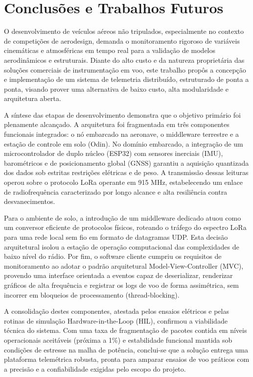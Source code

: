 \chapter{Conclusões e Trabalhos Futuros}
\label{chap:conclusoes-e-trabalhos-futuros}

O desenvolvimento de veículos aéreos não tripulados, especialmente no contexto de competições de aerodesign, demanda o monitoramento rigoroso de variáveis cinemáticas e atmosféricas em tempo real para a validação de modelos aerodinâmicos e estruturais. Diante do alto custo e da natureza proprietária das soluções comerciais de instrumentação em voo, este trabalho propôs a concepção e implementação de um sistema de telemetria distribuído, estruturado de ponta a ponta, visando prover uma alternativa de baixo custo, alta modularidade e arquitetura aberta.

A síntese das etapas de desenvolvimento demonstra que o objetivo primário foi plenamente alcançado. A arquitetura foi fragmentada em três componentes funcionais integrados: o nó embarcado na aeronave, o middleware terrestre e a estação de controle em solo (Odin). No domínio embarcado, a integração de um microcontrolador de duplo núcleo (ESP32) com sensores inerciais (IMU), barométricos e de posicionamento global (GNSS) garantiu a aquisição quantizada dos dados sob estritas restrições elétricas e de peso. A transmissão dessas leituras operou sobre o protocolo LoRa operante em 915 MHz, estabelecendo um enlace de radiofrequência caracterizado por longo alcance e alta resiliência contra desvanecimentos.

Para o ambiente de solo, a introdução de um middleware dedicado atuou como um conversor eficiente de protocolos físicos, roteando o tráfego do espectro LoRa para uma rede local sem fio em formato de datagramas UDP. Esta decisão arquitetural isolou a estação de operação computacional das complexidades de baixo nível do rádio. Por fim, o software cliente cumpriu os requisitos de monitoramento ao adotar o padrão arquitetural Model-View-Controller (MVC), provendo uma interface orientada a eventos capaz de deserializar, renderizar gráficos de alta frequência e registrar os logs de voo de forma assimétrica, sem incorrer em bloqueios de processamento (thread-blocking).

A consolidação destes componentes, atestada pelos ensaios elétricos e pelas rotinas de simulação Hardware-in-the-Loop (HIL), confirmou a viabilidade técnica do sistema. Com uma taxa de fragmentação de pacotes contida em níveis operacionais aceitáveis (próxima a 1\%) e estabilidade funcional mantida sob condições de estresse na malha de potência, conclui-se que a solução entrega uma plataforma telemétrica robusta, pronta para amparar ensaios de voo práticos com a precisão e a confiabilidade exigidas pelo escopo do projeto.


